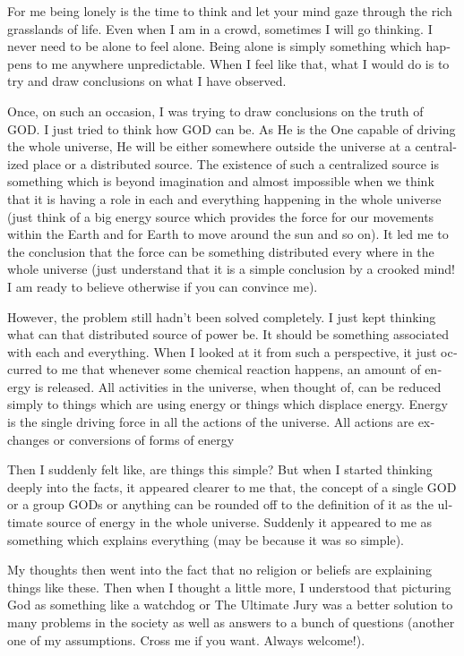 \begin{english}
\vskip 2pt
For me being lonely is the time to think and let your mind gaze through the rich grasslands of life. Even when I am in a crowd, sometimes I will go thinking. I never need to be alone to feel alone. Being alone is simply something which happens to me anywhere unpredictable. When I feel like that, what I would do is to try and draw conclusions on what I have observed.

Once, on such an occasion, I was trying to draw conclusions on the truth of GOD. I just tried to think how GOD can be. As He is the One capable of driving the whole universe, He will be either somewhere outside the universe at a centralized place or a distributed source. The existence of such a centralized source is something which is beyond imagination and almost impossible when we think that it is having a role in each and everything happening in the whole universe (just think of a big energy source which provides the force for our movements within the Earth and for Earth to move around the sun and so on). It led me to the conclusion that the force can be something distributed every where in the whole universe (just understand that it is a simple conclusion by a crooked mind! I am ready to believe otherwise if you can convince me).

However, the problem still hadn't been solved completely. I just kept thinking what can that distributed source of power be. It should be something associated with each and everything. When I looked at it from such a perspective, it just occurred to me that whenever some chemical reaction happens, an amount of energy is released. All activities in the universe, when thought of, can be reduced simply to things which are using energy or things which displace energy. Energy is the single driving force in all the actions of the universe. All actions are exchanges or conversions of forms of energy

Then I suddenly felt like, are things this simple? But when I started thinking deeply into the facts, it appeared clearer to me that, the concept of a single GOD or a group GODs or anything can be rounded off to the definition of it as the ultimate source of energy in the whole universe. Suddenly it appeared to me as something which explains everything (may be because it was so simple).

My thoughts then went into the fact that no religion or beliefs are explaining things like these. Then when I thought a little more, I understood that picturing God as something like a watchdog or The Ultimate Jury was a better solution to many problems in the society as well as answers to a bunch of questions (another one of my assumptions. Cross me if you want. Always welcome!).


\end{english}
